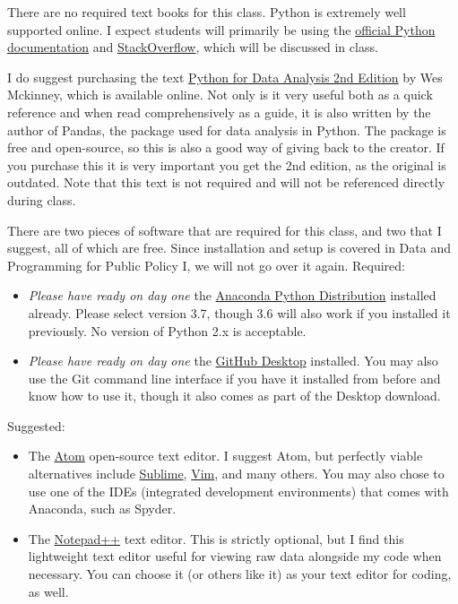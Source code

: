 \documentclass{article}
\begin{document}
There are no required text books for this class.  Python is extremely well supported online.  I expect students will primarily be using the \href{https://docs.python.org/3/}{official Python documentation} and \href{https://stackoverflow.com/}{StackOverflow}, which will be discussed in class.  

I do suggest purchasing the text \href{https://www.amazon.com/Python-Data-Analysis-Wrangling-IPython/dp/1491957662/ref=sr_1_3?ie=UTF8\&qid=1550574627\&sr=8-3\&keywords=python+for+data+analysis+2nd}{Python for Data Analysis 2nd Edition} by Wes Mckinney, which is available online.  Not only is it very useful both as a quick reference and when read comprehensively as a guide, it is also written by the author of Pandas, the package used for data analysis in Python.  The package is free and open-source, so this is also a good way of giving back to the creator.  If you purchase this it is very important you get the 2nd edition, as the original is outdated.  Note that this text is not required and will not be referenced directly during class.

There are two pieces of software that are required for this class, and two that I suggest, all of which are free.  Since installation and setup is covered in Data and Programming for Public Policy I, we will not go over it again.  Required:
\begin{itemize}
	\item \emph{Please have ready on day one} the \href{https://www.anaconda.com/distribution/}{Anaconda Python Distribution} installed already.  Please select version 3.7, though 3.6 will also work  if you installed it previously.  No version of Python 2.x is acceptable.
	\item \emph{Please have ready on day one} the \href{https://desktop.github.com/}{GitHub Desktop} installed.  You may also use the Git command line interface if you have it installed from before and know how to use it, though it also comes as part of the Desktop download.
\end{itemize}

Suggested:
\begin{itemize}
	\item The \href{https://atom.io/}{Atom} open-source text editor. I suggest Atom, but perfectly viable alternatives include \href{https://www.sublimetext.com/}{Sublime}, \href{https://www.vim.org/}{Vim}, and many others.  You may also chose to use one of the IDEs (integrated development environments) that comes with Anaconda, such as Spyder.
	\item The \href{https://notepad-plus-plus.org/}{Notepad++} text editor.  This is strictly optional, but I find this lightweight text editor useful for viewing raw data alongside my code when necessary.  You can choose it (or others like it) as your text editor for coding, as well.
\end{itemize}
\end{document}
